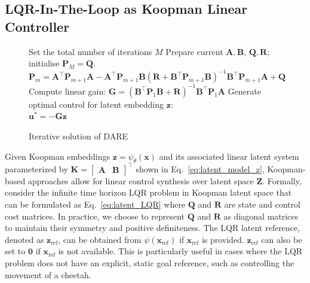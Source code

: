 \documentclass{article}
\begin{document}
\subsection{LQR-In-The-Loop as Koopman Linear Controller}
\begin{figure}
\vspace{-12pt}
    \begin{algorithm}[H]
        \caption{\small Iterative solution of DARE}
        \label{algo:DARE}
        \small
    \begin{algorithmic}[1]
    \STATE Set the total number of iterations $M$
    \STATE Prepare  current  $\mathbf{A},\mathbf{B}$, $\mathbf{Q}, \mathbf{R}$; initialise $\mathbf{P}_M = \mathbf{Q}$.
        \STATE $\mathbf{P}_m=\mathbf{A}^\top \mathbf{P}_{m+1}\mathbf{A} - \mathbf{A}^\top \mathbf{P}_{m+1}\mathbf{B}(\mathbf{R}+\mathbf{B}^\top \mathbf{P}_{m+1}\mathbf{B})^{-1}\mathbf{B}^\top \mathbf{P}_{m+1}\mathbf{A}+\mathbf{Q}$
    \ENDFOR
    \STATE Compute linear gain:
    $\mathbf{G} = (\mathbf{B}^\top \mathbf{P}_1 \mathbf{B} + \mathbf{R})^{-1} \mathbf{B}^\top \mathbf{P}_1 \mathbf{A}$
    \STATE Generate optimal control for latent embedding $\mathbf{z}$: \\
    $\mathbf{u}^*=-\mathbf{G}\mathbf{z}$
    \end{algorithmic}
\end{algorithm}
\end{figure}
Given Koopman embeddings $\mathbf{z} = \psi_{\theta}(\mathbf{x})$ and its associated linear latent system  parameterized by $\mathbf{K}=\begin{bmatrix}
    \mathbf{A} & \mathbf{B}
\end{bmatrix}^\top$ shown in Eq.~\eqref{eq:latent_model_z}, Koopman-based approaches allow for linear control synthesis over latent space $\mathbf{Z}$. 
%
Formally, consider the infinite  time horizon LQR problem in Koopman latent space that can be formulated as Eq.~\eqref{eq:latent_LQR}
where $\mathbf{Q}$ and $\mathbf{R}$ are state and control cost matrices. In practice, we choose to represent $\mathbf{Q}$ and $\mathbf{R}$ as diagonal matrices to maintain their symmetry and positive definiteness.
%
The LQR latent reference, denoted as $\mathbf{z}_\text{ref}$, can be obtained from $\psi(\mathbf{x}_\text{ref})$ if $\mathbf{x}_\text{ref}$ is provided. $\mathbf{z}_\text{ref}$ can also be set to $\mathbf{0}$ if $\mathbf{x}_\text{ref}$ is not available. This is particularly useful in cases where the LQR problem does not have an explicit, static goal reference, such as controlling the movement of a cheetah.
\end{document}
